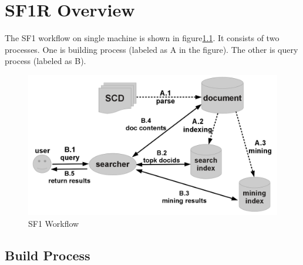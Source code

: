 \chapter{SF1R Overview}

The SF1 workflow on single machine is shown in figure\ref{fig:sf1_workflow}.
It consists of two processes. One is building process (labeled as A in the figure). The other is query process (labeled as B).

\begin{figure}[htp]
\centering
\includegraphics[width=.8\textwidth]{Figures/sf1_workflow.png}
\caption{SF1 Workflow}\label{fig:sf1_workflow}
\end{figure}

\section{Build Process}

